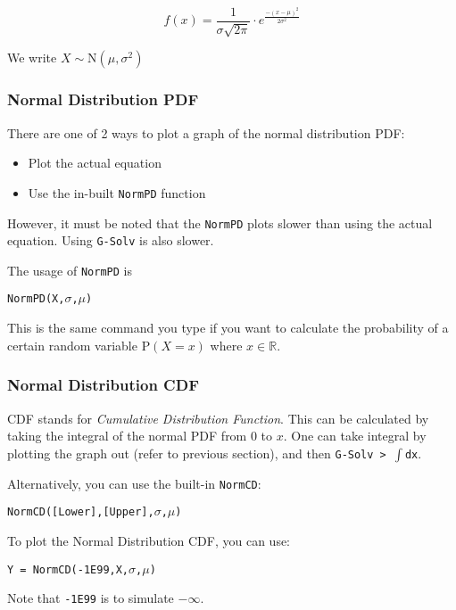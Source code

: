 \documentclass[a5paper]{memoir}
\def\code#1{\texttt{#1}}
\newcommand{\addtoindex}[1]{#1\index{#1}}
\begin{document}
\begin{equation}
	f(x)=\frac{1}{\sigma\sqrt{2\pi}} \cdot e^{\frac{-(x-\mu)^2}{2\sigma^2}}
\end{equation}

We write $X \sim \mathrm{N} (\mu,\sigma^2)$

\subsubsection{Normal Distribution PDF}
There are one of 2 ways to plot a graph of the normal distribution PDF:

\begin{itemize}
	\item Plot the actual equation
	\item Use the in-built \code{NormPD} function
\end{itemize}

However, it must be noted that the \code{NormPD} plots slower than using the actual equation. Using \code{G-Solv} is also slower.

The usage of \code{\addtoindex{NormPD}} is 
\begin{center}
	\code{NormPD(X,$\sigma$,$\mu$)}
\end{center}

This is the same command you type if you want to calculate the probability of a certain random variable $\textrm{P}(X = x)$ where $x \in \mathbb{R}$.

\subsubsection{Normal Distribution CDF}
CDF stands for \textit{Cumulative Distribution Function}. This can be calculated by taking the integral of the normal PDF from 0 to $x$. One can take integral by plotting the graph out (refer to previous section), and then \code{G-Solv > $\int$dx}.

Alternatively, you can use the built-in \code{\addtoindex{NormCD}}:
\begin{center}
	\code{NormCD([Lower],[Upper],$\sigma$,$\mu$)}
\end{center}

To plot the Normal Distribution CDF, you can use:
\begin{center}
	\code{Y = NormCD(-1E99,X,$\sigma$,$\mu$)}
\end{center}

Note that \code{-1E99} is to simulate $-\infty$.
\end{document}
